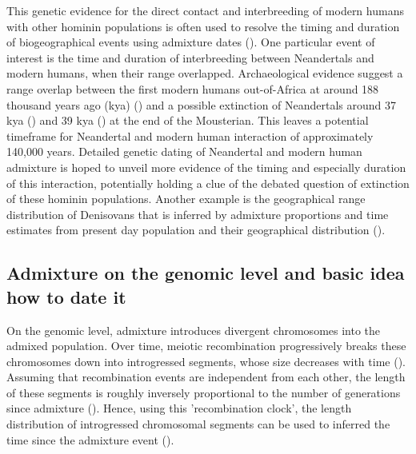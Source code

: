 \documentclass[]{article}
\begin{document}
This genetic evidence for the direct contact and interbreeding of modern humans with other hominin populations is often used to resolve the timing and duration of biogeographical events using admixture dates (\cite{sankararaman_date_2012,jacobs_multiple_2019,vyas_analyses_2019}). One particular event of interest is the time and duration of interbreeding between Neandertals and modern humans, when their range overlapped. Archaeological evidence suggest a range overlap between the first modern humans out-of-Africa at around 188 thousand years ago (kya) (\cite{stringer_when_2018,hershkovitz_earliest_2018}) and a possible extinction of Neandertals around 37 kya (\cite{zilhao_precise_2017}) and 39 kya (\cite{higham_timing_2014}) at the end of the Mousterian. This leaves a potential timeframe for Neandertal and modern human interaction of approximately 140,000 years. Detailed genetic dating of Neandertal and modern human admixture is hoped to unveil more evidence of the timing and especially duration of this interaction,
potentially holding a clue of the debated question of extinction of these hominin populations. Another example is the geographical range distribution of Denisovans that is inferred by admixture proportions and time estimates from present day population and their geographical distribution (\cite{jacobs_multiple_2019}). 

\subsection{Admixture on the genomic level and basic idea how to date
it}\label{admixture-on-the-genomic-level-and-basic-idea-how-to-date-it}

On the genomic level, admixture introduces  divergent chromosomes
into the admixed population. Over time, meiotic recombination
progressively breaks these chromosomes down into introgressed segments, whose size decreases with time (\cite{falush_inference_2003}). 
Assuming that recombination events are
independent from each other, the length of these segments  is roughly inversely proportional to  the number of
generations since admixture
(\cite{moorjani_history_2011,pool_inference_2009,gravel_population_2012,liang_lengths_2014}).
Hence, using this 'recombination clock', the length distribution of introgressed chromosomal segments
 can be used to inferred the time since the
admixture event 
(\cite{moorjani_history_2011,pugach_dating_2011,sankararaman_date_2012,loh_inferring_2013,sankararaman_combined_2016,pugach_gateway_2018,jacobs_multiple_2019,hellenthal_genetic_2014}).
\end{document}
